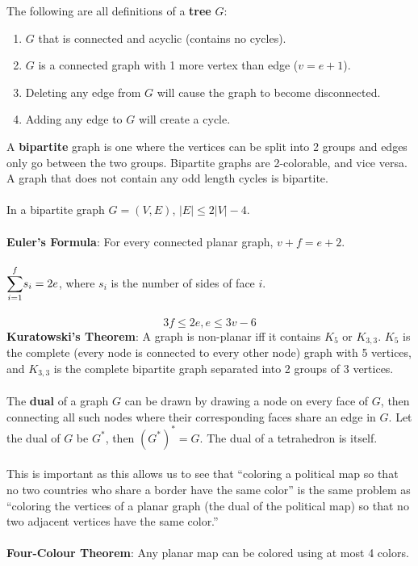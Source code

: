 \documentclass{article}
\theoremstyle{definition}
\begin{document}
The following are all definitions of a \textbf{tree} $G$: \begin{enumerate}
    \item $G$ that is connected and acyclic (contains no cycles).
    \item $G$ is a connected graph with 1 more vertex than edge ($v = e + 1$).
    \item Deleting any edge from $G$ will cause the graph to become disconnected.
    \item Adding any edge to $G$ will create a cycle.
\end{enumerate} $ $ \\
A \textbf{bipartite} graph is one where the vertices can be split into 2 groups and edges only go between the two groups. Bipartite graphs are 2-colorable, and vice versa. A graph that does not contain any odd length cycles is bipartite. \\ \\
In a bipartite graph $G = (V, E)$, $|E| \leq 2|V| - 4$. \\ \\
\textbf{Euler's Formula}: For every connected planar graph, $v + f = e + 2.$ \\ \\
$\mathlarger{\sum\limits_{i=1}^{f}} s_i = 2e$, where $s_i$ is the number of sides of face $i$. \\ \\
$$3f \leq 2e, e \leq 3v - 6$$ $ $ \\
\textbf{Kuratowski's Theorem}: A graph is non-planar iff it contains $K_5$ or $K_{3, 3}$. $K_5$ is the complete (every node is connected to every other node) graph with 5 vertices, and $K_{3, 3}$ is the complete bipartite graph separated into 2 groups of 3 vertices. \\ \\
The \textbf{dual} of a graph $G$ can be drawn by drawing a node on every face of $G$, then connecting all such nodes where their corresponding faces share an edge in $G$. Let the dual of $G$ be $G^*$, then $(G^*)^* = G$. The dual of a tetrahedron is itself. \\ \\
This is important as this allows us to see that ``coloring a political map so that no two countries who share a border have the same color'' is the same problem as ``coloring the vertices of a planar graph (the dual of the political map) so that no two adjacent vertices have the same color.'' \\ \\
\textbf{Four-Colour Theorem}: Any planar map can be colored using at most 4 colors.
\end{document}
